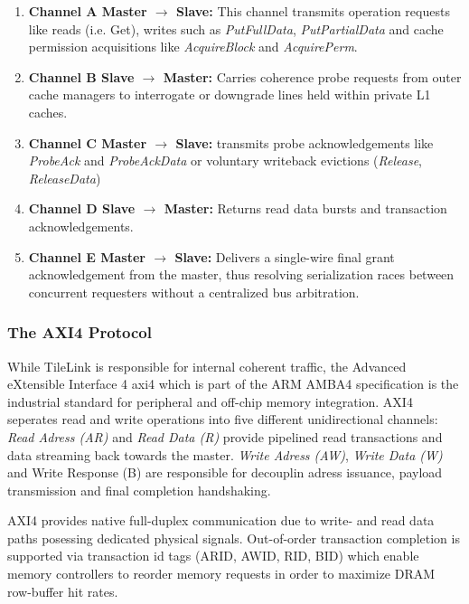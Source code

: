 \begin{enumerate}
  \item \textbf{Channel A Master $\rightarrow$ Slave:} This channel transmits operation requests like reads (i.e. Get),
    writes such as \textit{PutFullData}, \textit{PutPartialData} and cache permission acquisitions like \textit{AcquireBlock} and \textit{AcquirePerm}.
  \item \textbf{Channel B Slave $\rightarrow$ Master:} Carries coherence probe requests from outer cache managers to interrogate or downgrade lines held within private L1 caches.
  \item \textbf{Channel C Master $\rightarrow$ Slave:} transmits probe acknowledgements like \textit{ProbeAck} and \textit{ProbeAckData} or voluntary writeback evictions (\textit{Release}, \textit{ReleaseData})
\item \textbf{Channel D Slave $\rightarrow$ Master:} Returns read data bursts and transaction acknowledgements.
  \item \textbf{Channel E Master $\rightarrow$ Slave:} Delivers a single-wire final grant acknowledgement from the master, thus resolving serialization races between concurrent requesters without a centralized bus arbitration.
\end{enumerate}

\subsubsection{The AXI4 Protocol}

While TileLink is responsible for internal coherent traffic,
the Advanced eXtensible Interface 4 \gls{axi4} which is part of the ARM AMBA4 specification is the industrial standard for peripheral and off-chip memory integration. \cite{arm2011axi4}
AXI4 seperates read and write operations into five different unidirectional channels:
\textit{Read Adress (AR)} and \textit{Read Data (R)} provide pipelined read transactions and data streaming back towards the master.
\textit{Write Adress (AW)}, \textit{Write Data (W)} and Write Response (B) are responsible for decouplin adress issuance,
payload transmission and final completion handshaking.

AXI4 provides native full-duplex communication due to write- and read data paths posessing dedicated physical signals.
Out-of-order transaction completion is supported via transaction id tags (ARID, AWID, RID, BID)
which enable memory controllers to reorder memory requests in order to maximize DRAM row-buffer hit rates.

